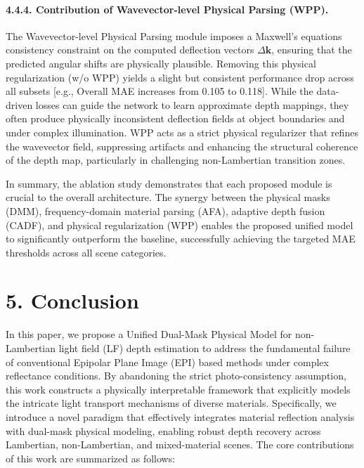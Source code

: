 \documentclass[lettersize,journal]{IEEEtran}
\begin{document}
\paragraph{4.4.4. Contribution of Wavevector-level Physical Parsing (WPP).}
The Wavevector-level Physical Parsing module imposes a Maxwell's equations consistency constraint on the computed deflection vectors $\Delta\bm{k}$, ensuring that the predicted angular shifts are physically plausible. Removing this physical regularization (w/o WPP) yields a slight but consistent performance drop across all subsets  [e.g., Overall MAE increases from 0.105 to 0.118]. While the data-driven losses can guide the network to learn approximate depth mappings, they often produce physically inconsistent deflection fields at object boundaries and under complex illumination. WPP acts as a strict physical regularizer that refines the wavevector field, suppressing artifacts and enhancing the structural coherence of the depth map, particularly in challenging non-Lambertian transition zones. 

In summary, the ablation study demonstrates that each proposed module is crucial to the overall architecture. The synergy between the physical masks (DMM), frequency-domain material parsing (AFA), adaptive depth fusion (CADF), and physical regularization (WPP) enables the proposed unified model to significantly outperform the baseline, successfully achieving the targeted MAE thresholds across all scene categories.


\section{5. Conclusion}


In this paper, we propose a Unified Dual-Mask Physical Model for non-Lambertian light field (LF) depth estimation to address the fundamental failure of conventional Epipolar Plane Image (EPI) based methods under complex reflectance conditions. By abandoning the strict photo-consistency assumption, this work constructs a physically interpretable framework that explicitly models the intricate light transport mechanisms of diverse materials. Specifically, we introduce a novel paradigm that effectively integrates material reflection analysis with dual-mask physical modeling, enabling robust depth recovery across Lambertian, non-Lambertian, and mixed-material scenes. The core contributions of this work are summarized as follows:
\end{document}
